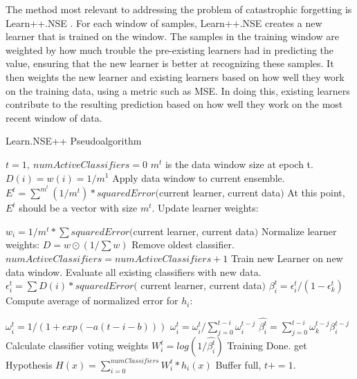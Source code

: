 	\par The method most relevant to addressing the problem of catastrophic forgetting is Learn++.NSE \cite{learnNseIntro}. For each window of samples, Learn++.NSE creates a new learner that is trained on the window. The samples in the training window are weighted by how much trouble the pre-existing learners had in predicting the value, ensuring that the new learner is better at recognizing these samples. It then weights the new learner and existing learners based on how well they work on the training data, using a metric such as MSE. In doing this, existing learners contribute to the resulting prediction based on how well they work on the most recent window of data. 
		\begin{algorithm}[ht!]
		\caption{Learn.NSE++ Pseudoalgorithm}
		\label{bg:nseSection}
		\begin{algorithmic}[1]
			\State $t=1,\ numActiveClassifiers = 0$ 
			\State $m^t$ is the data window size at epoch t.
			\State $D(i) = w(i) = 1/m^1$
			\EndFor
			\Else
			\State Apply data window to current ensemble. 
			\State $E^t = \sum^{m^t}(1/m^t) * squaredError($current learner, current data$)$
			\State At this point, $E^t$ should be a vector with size $m^t$.
			\State Update learner weights: \par
					\algTab\algTab\algTab$w_i = 1/m^t * \sum squaredError($current learner, current data$)$
			\EndFor
			\State Normalize learner weights: $D = w \odot (1/\sum w)$
			\EndIf
			\State Remove oldest classifier.
			\Else
			 $numActiveClassifiers = numActiveClassifiers + 1$
			\EndIf
			\State Train new Learner on new data window.
			\State Evaluate all existing classifiers with new data.
			\State $\epsilon_i^t = \sum D(i) * squaredError($ current learner, current data$)$
			\State $\beta_i^t = \epsilon_i^t/(1-\epsilon_k^t) $
			\State Compute average of normalized error for $h_i$: \par
					\algTab\algTab\algTab$\omega_i^t = 1/(1+exp(-a(t-i-b)))$
			\State $\omega_i^t = \omega_i^t / \sum_{j=0}^{t-i} \omega_i^{t-j}$
			\State $\hat{\beta_i^t} = \sum_{j=0}^{t-i} \omega_k^{t-j} \beta_i^{t-j}$
			\State Calculate classifier voting weights $W_i^t = log(1/\hat{\beta_i^t})$
			\EndIf
			\EndFor
			\State Training Done.
			\State get Hypothesis $H(x) =\sum_{i=0}^{numClassifiers} W_i^t * h_i(x) $
			\EndWhile
			\State Buffer full, $t += 1$.
			\EndWhile
			\EndProcedure
		\end{algorithmic}
	\end{algorithm}

